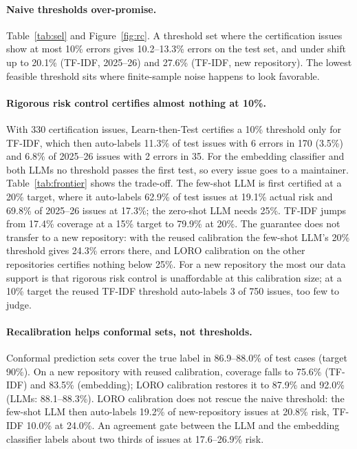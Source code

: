 \paragraph{Naive thresholds over-promise.} Table~\ref{tab:sel} and Figure~\ref{fig:rc}. A threshold
set where the certification issues show at most 10\% errors gives 10.2--13.3\% errors on the test
set, and under shift up to 20.1\% (TF-IDF, 2025--26) and 27.6\% (TF-IDF, new repository). The lowest
feasible threshold sits where finite-sample noise happens to look favorable.

\paragraph{Rigorous risk control certifies almost nothing at 10\%.} With 330 certification issues,
Learn-then-Test certifies a 10\% threshold only for TF-IDF, which then auto-labels 11.3\% of test
issues with 6 errors in 170 (3.5\%) and 6.8\% of 2025--26 issues with 2 errors in 35. For the embedding
classifier and both LLMs no threshold passes the first test, so every issue goes to a maintainer.
Table~\ref{tab:frontier} shows the trade-off. The few-shot LLM is first certified at a 20\% target,
where it auto-labels 62.9\% of test issues at 19.1\% actual risk and 69.8\% of 2025--26 issues at
17.3\%; the zero-shot LLM needs 25\%. TF-IDF jumps from 17.4\% coverage at a 15\% target to 79.9\% at
20\%. The guarantee does not transfer to a new repository: with the reused calibration the few-shot
LLM's 20\% threshold gives 24.3\% errors there, and LORO calibration on the other repositories
certifies nothing below 25\%. For a new repository the most our data support is that rigorous risk
control is unaffordable at this calibration size; at a 10\% target the reused TF-IDF threshold
auto-labels 3 of 750 issues, too few to judge.

\paragraph{Recalibration helps conformal sets, not thresholds.} Conformal prediction sets cover the
true label in 86.9--88.0\% of test cases (target 90\%). On a new repository with reused calibration,
coverage falls to 75.6\% (TF-IDF) and 83.5\% (embedding); LORO calibration restores it to 87.9\% and
92.0\% (LLMs: 88.1--88.3\%). LORO calibration does not rescue the naive threshold: the few-shot LLM
then auto-labels 19.2\% of new-repository issues at 20.8\% risk, TF-IDF 10.0\% at 24.0\%. An
agreement gate between the LLM and the embedding classifier labels about two thirds of issues at
17.6--26.9\% risk.

